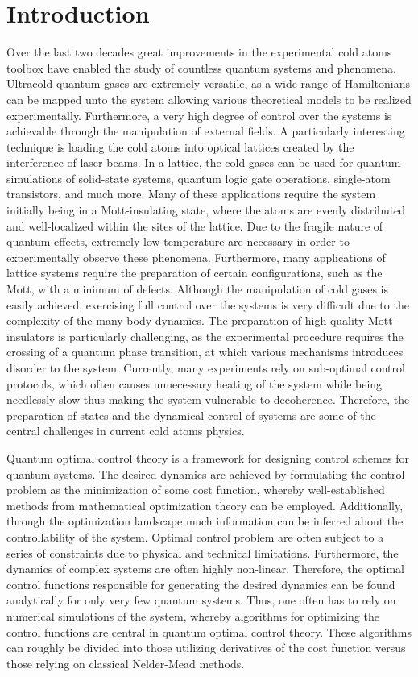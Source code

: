 \chapter{Introduction}
Over the last two decades great improvements in the experimental cold atoms toolbox have enabled the study of countless quantum systems and phenomena. Ultracold quantum gases are extremely versatile, as a wide range of Hamiltonians can be mapped unto the system allowing various theoretical models to be realized experimentally. Furthermore, a very high degree of control over the systems is achievable through the manipulation of external fields.
A particularly interesting technique is loading the cold atoms into optical lattices created by the interference of laser beams. In a lattice, the cold gases can be used for quantum simulations of solid-state systems, quantum logic gate operations, single-atom transistors, and much more. Many of these applications require the system initially being in a Mott-insulating state, where the atoms are evenly distributed and well-localized within the sites of the lattice.
Due to the fragile nature of quantum effects, extremely low temperature are necessary in order to experimentally observe these phenomena. Furthermore, many applications of lattice systems require the preparation of certain configurations, such as the Mott, with a minimum of defects. Although the manipulation of cold gases is easily achieved, exercising full control over the systems is very difficult due to the complexity of the many-body dynamics. The preparation of high-quality Mott-insulators is particularly challenging, as the experimental procedure requires the crossing of a quantum phase transition, at which various mechanisms introduces disorder to the system. Currently, many experiments rely on sub-optimal control protocols, which often causes unnecessary heating of the system while being needlessly slow thus making the system vulnerable to decoherence.
Therefore, the preparation of states and the dynamical control of systems are some of the central challenges in current cold atoms physics.

Quantum optimal control theory is a framework for designing control schemes for quantum systems. The desired dynamics are achieved by formulating the control problem as the minimization of some cost function, whereby well-established methods from mathematical optimization theory can be employed. Additionally, through the optimization landscape much information can be inferred about the controllability of the system. Optimal control problem are often subject to a series of constraints due to physical and technical limitations. Furthermore, the dynamics of complex systems are often highly non-linear. Therefore, the optimal control functions responsible for generating the desired dynamics can be found analytically for only very few quantum systems. Thus, one often has to rely on numerical simulations of the system, whereby algorithms for optimizing the control functions are central in quantum optimal control theory. These algorithms can roughly be divided into those utilizing derivatives of the cost function versus those relying on classical Nelder-Mead methods.

